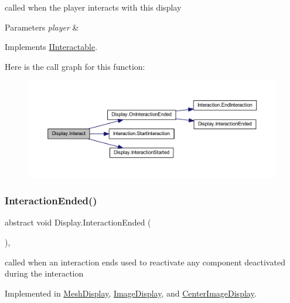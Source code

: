 called when the player interacts with this display 


\begin{DoxyParams}{Parameters}
{\em player} & \\
\hline
\end{DoxyParams}


Implements \mbox{\hyperlink{interface_i_interactable_a736e28381ac0e7ca60f5fae2feb95afe}{I\+Interactable}}.

Here is the call graph for this function\+:
\nopagebreak
\begin{figure}[H]
\begin{center}
\leavevmode
\includegraphics[width=350pt]{class_display_a43fc2a6f19bbf2f1bdb676392b37e921_cgraph}
\end{center}
\end{figure}
\mbox{\label{class_display_a6fd38485267e1b78f1d1dfb589ec4ae0}} 
\subsubsection{\texorpdfstring{Interaction\+Ended()}{InteractionEnded()}}
{\footnotesize\ttfamily abstract void Display.\+Interaction\+Ended (\begin{DoxyParamCaption}{ }\end{DoxyParamCaption})\hspace{0.3cm}{\ttfamily [protected]}, {}}



called when an interaction ends used to reactivate any component deactivated during the interaction 



Implemented in \mbox{\hyperlink{class_mesh_display_a23f7ab8b0f48536940ad1cc2145297b3}{Mesh\+Display}}, \mbox{\hyperlink{class_image_display_a94c5928ef81449c37740d0bd0a8f4062}{Image\+Display}}, and \mbox{\hyperlink{class_center_image_display_ac78f5ea36aa445bb3d12124f1baf814d}{Center\+Image\+Display}}.


